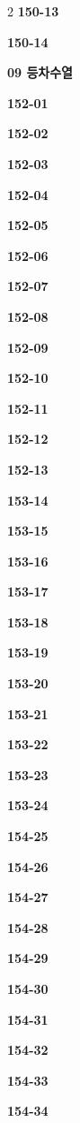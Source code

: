 \documentclass[10pt,a4paper]{article}
\begin{document}
\begin{multicols}{2}
\noindent\textbf{150-13}\ \par
\noindent\textbf{150-14}\ \par
\noindent\textbf{09 등차수열}\par\smallskip
\noindent\textbf{152-01}\ \par
\noindent\textbf{152-02}\ \par
\noindent\textbf{152-03}\ \par
\noindent\textbf{152-04}\ \par
\noindent\textbf{152-05}\ \par
\noindent\textbf{152-06}\ \par
\noindent\textbf{152-07}\ \par
\noindent\textbf{152-08}\ \par
\noindent\textbf{152-09}\ \par
\noindent\textbf{152-10}\ \par
\noindent\textbf{152-11}\ \par
\noindent\textbf{152-12}\ \par
\noindent\textbf{152-13}\ \par
\noindent\textbf{153-14}\ \par
\noindent\textbf{153-15}\ \par
\noindent\textbf{153-16}\ \par
\noindent\textbf{153-17}\ \par
\noindent\textbf{153-18}\ \par
\noindent\textbf{153-19}\ \par
\noindent\textbf{153-20}\ \par
\noindent\textbf{153-21}\ \par
\noindent\textbf{153-22}\ \par
\noindent\textbf{153-23}\ \par
\noindent\textbf{153-24}\ \par
\noindent\textbf{154-25}\ \par
\noindent\textbf{154-26}\ \par
\noindent\textbf{154-27}\ \par
\noindent\textbf{154-28}\ \par
\noindent\textbf{154-29}\ \par
\noindent\textbf{154-30}\ \par
\noindent\textbf{154-31}\ \par
\noindent\textbf{154-32}\ \par
\noindent\textbf{154-33}\ \par
\noindent\textbf{154-34}\ \par

\end{multicols}
\end{document}
